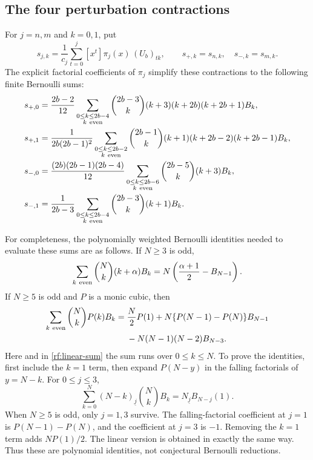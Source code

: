 \documentclass[11pt,a4paper]{article}
\numberwithin{equation}{section}
\theoremstyle{plain}
\theoremstyle{definition}
\theoremstyle{remark}
\begin{document}
\subsection{The four perturbation contractions}

For $j=n,m$ and $k=0,1$, put
\[
 s_{j,k}=\frac1{c_j}\sum_{t=0}^j[x^t]\pi_j(x)\,(U_b)_{tk},
 \qquad s_{+,k}=s_{n,k},\quad s_{-,k}=s_{m,k}.
\]
The explicit factorial coefficients of $\pi_j$ simplify these
contractions to the following finite Bernoulli sums:
\begin{align}
 s_{+,0}&=\frac{2b-2}{12}
 \sum_{\substack{0\leq k\leq2b-4\\k\ {\rm even}}}
 \binom{2b-3}{k}(k+3)(k+2b)(k+2b+1)B_k,\notag\\
 s_{+,1}&=\frac1{2b(2b-1)^2}
 \sum_{\substack{0\leq k\leq2b-2\\k\ {\rm even}}}
 \binom{2b-1}{k}(k+1)(k+2b-2)(k+2b-1)B_k,\notag\\
 s_{-,0}&=\frac{(2b)(2b-1)(2b-4)}{12}
 \sum_{\substack{0\leq k\leq2b-6\\k\ {\rm even}}}
 \binom{2b-5}{k}(k+3)B_k,\notag\\
 s_{-,1}&=\frac1{2b-3}
 \sum_{\substack{0\leq k\leq2b-4\\k\ {\rm even}}}
 \binom{2b-3}{k}(k+1)B_k.
 \label{rf:finite-sums}
\end{align}

For completeness, the polynomially weighted Bernoulli identities
needed to evaluate these sums are as follows.  If $N\geq3$ is odd,
\begin{equation}\label{rf:linear-sum}
 \sum_{k\ {\rm even}}\binom Nk(k+\alpha)B_k
 =N\left(\frac{\alpha+1}{2}-B_{N-1}\right).
\end{equation}
If $N\geq5$ is odd and $P$ is a monic cubic, then
\begin{align}
 \sum_{k\ {\rm even}}\binom NkP(k)B_k
 ={}&\frac N2P(1)
   +N\{P(N-1)-P(N)\}B_{N-1}\notag\\
 &-N(N-1)(N-2)B_{N-3}.
 \label{rf:cubic-sum}
\end{align}
Here and in \eqref{rf:linear-sum} the sum runs over $0\leq k\leq N$.
To prove the identities, first include the $k=1$ term, then expand
$P(N-y)$ in the falling factorials of $y=N-k$.  For $0\leq j\leq3$,
\[
 \sum_{k=0}^N(N-k)_{\underline j}\binom NkB_k
 =N_{\underline j}B_{N-j}(1).
\]
When $N\geq5$ is odd, only $j=1,3$ survive.  The falling-factorial
coefficient at $j=1$ is $P(N-1)-P(N)$, and the coefficient at
$j=3$ is $-1$.  Removing the $k=1$ term adds $NP(1)/2$.
The linear version is obtained in exactly the same way.  Thus these
are polynomial identities, not conjectural Bernoulli reductions.
\end{document}
